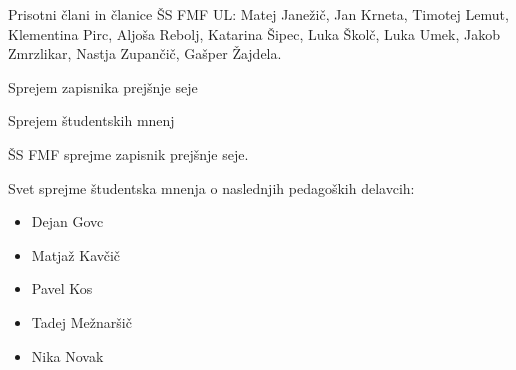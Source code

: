 \documentclass{seja}
\begin{document}
Prisotni člani in članice ŠS FMF UL:
Matej Janežič,
Jan Krneta,
Timotej Lemut,
Klementina Pirc,
Aljoša Rebolj,
Katarina Šipec,
Luka Školč,
Luka Umek,
Jakob Zmrzlikar,
Nastja Zupančič,
Gašper Žajdela.

\begin{red}
	\item
	Sprejem zapisnika prejšnje seje
    \item
    Sprejem študentskih mnenj

\end{red}

\begin{ad}
    \item
    \begin{sklep*}
        ŠS FMF sprejme zapisnik prejšnje seje.
    \end{sklep*}
    
    \item
    \begin{sklep*}
    Svet sprejme študentska mnenja o naslednjih pedagoških delavcih:
    \begin{itemize}
        \item Dejan Govc
        \item Matjaž Kavčič 
        \item Pavel Kos
        \item Tadej Mežnaršič
        \item Nika Novak
    \end{itemize}
    \end{sklep*}
\end{ad}

\makeatletter \global\let\@enddocumenthook\@empty \makeatother
{}
\end{document}
